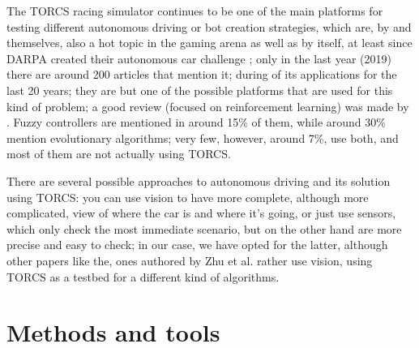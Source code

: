 \documentclass[10pt,journal,compsoc]{IEEEtran}
\begin{document}

The TORCS racing simulator continues to be one of the main platforms
for testing different autonomous driving or bot creation strategies,
which are, by and themselves, also a hot topic in the gaming arena as
well as by itself, at least since DARPA created their autonomous car
challenge \cite{badue2019selfdriving};
only in the last year (2019) there are around 200 articles that
mention it; during  \cite{schiavullo2019torcs} of its
applications for the last 20 years; they are but one of the possible
platforms that are used for this kind of problem; a good review
(focused on reinforcement learning) was made by
\cite{abuzekry2comparative}. Fuzzy controllers are mentioned in around
15\% of them, while around 30\% mention evolutionary algorithms; very
few, however, around 7\%, use both, and most of them are not actually
using TORCS.

There are several possible approaches to autonomous driving and its
solution using TORCS: you can use vision to have more complete,
although more complicated, view of where the car is and where it's
going, or just use sensors, which only check the most immediate
scenario, but on the other hand are more precise and easy to check; in
our case, we have opted for the latter, although other papers like the,
ones authored by Zhu et al. \cite{zhu2018driving,zhu2019vision,neurone} rather
use vision, using TORCS as a testbed for a different kind of algorithms.





\section{Methods and tools}
\label{sec:methods}
\end{document}
